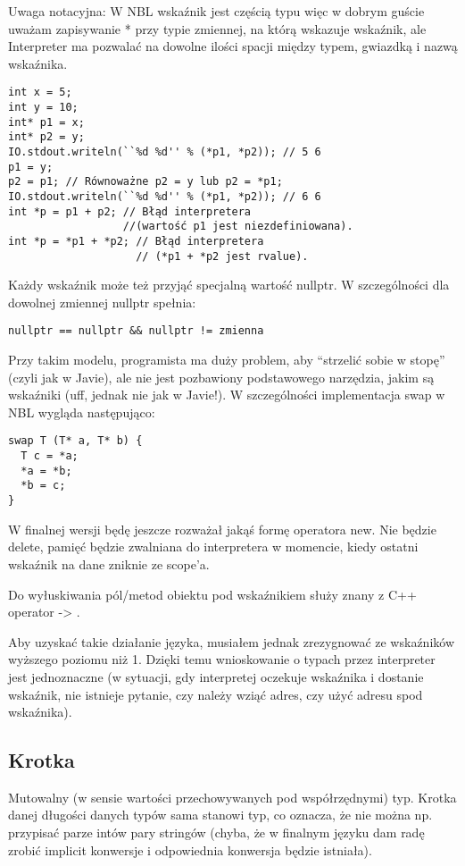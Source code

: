 \documentclass[a4paper,10pt]{scrartcl}
\begin{document}
Uwaga notacyjna: W NBL wskaźnik jest częścią typu więc w dobrym guście uważam zapisywanie * przy typie zmiennej, na którą wskazuje wskaźnik, ale
Interpreter ma pozwalać na dowolne ilości spacji między typem, gwiazdką i nazwą wskaźnika.

\begin{lstlisting}
int x = 5;
int y = 10;
int* p1 = x;
int* p2 = y;
IO.stdout.writeln(``%d %d'' % (*p1, *p2)); // 5 6
p1 = y;
p2 = p1; // Równoważne p2 = y lub p2 = *p1;
IO.stdout.writeln(``%d %d'' % (*p1, *p2)); // 6 6
int *p = p1 + p2; // Błąd interpretera 
                  //(wartość p1 jest niezdefiniowana).
int *p = *p1 + *p2; // Błąd interpretera 
                    // (*p1 + *p2 jest rvalue).
\end{lstlisting}

Każdy wskaźnik może też przyjąć specjalną wartość nullptr. W szczególności dla dowolnej zmiennej nullptr spełnia:
\begin{lstlisting}
nullptr == nullptr && nullptr != zmienna
\end{lstlisting}

Przy takim modelu, programista ma duży problem, aby ``strzelić sobie w stopę'' (czyli jak w Javie), ale nie jest pozbawiony podstawowego narzędzia,
jakim są wskaźniki (uff, jednak nie jak w Javie!). W szczególności implementacja swap w NBL wygląda następująco:
\begin{lstlisting}
swap T (T* a, T* b) {
  T c = *a;
  *a = *b;
  *b = c; 
}
\end{lstlisting}

W finalnej wersji będę jeszcze rozważał jakąś formę operatora new. Nie będzie delete, pamięć będzie zwalniana do interpretera w momencie, kiedy
ostatni wskaźnik na dane zniknie ze scope'a.

Do wyłuskiwania pól/metod obiektu pod wskaźnikiem służy znany z C++ operator -> .

Aby uzyskać takie działanie języka, musiałem jednak zrezygnować ze wskaźników wyższego poziomu niż 1. Dzięki temu wnioskowanie o typach przez 
interpreter jest jednoznaczne (w sytuacji, gdy interpretej oczekuje wskaźnika i dostanie wskaźnik, nie istnieje pytanie, czy należy wziąć adres,
czy użyć adresu spod wskaźnika).

\subsection{Krotka}
Mutowalny (w sensie wartości przechowywanych pod współrzędnymi) typ. Krotka danej długości danych typów sama stanowi typ, co oznacza, że nie można
np. przypisać parze intów pary stringów (chyba, że w finalnym języku dam radę zrobić implicit konwersje i odpowiednia konwersja będzie istniała).
\end{document}
